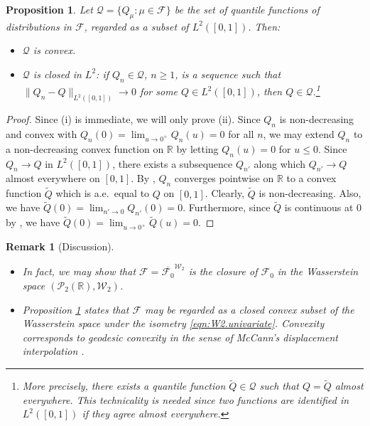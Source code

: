 \documentclass{article}
\newcommand{\bR}{\mathbb{R}}
\newcommand{\cF}{\mathcal{F}}
\newcommand{\cP}{\mathcal{P}}
\newcommand{\cQ}{\mathcal{Q}}
\newcommand{\W}{\mathcal{W}_2}
\numberwithin{equation}{section}
\newtheorem{proposition}[theorem]{Proposition}
\newtheorem{remark}[theorem]{Remark}
\begin{document}
\begin{proposition} \label{prop:Q.geometry}
Let $\cQ = \{Q_{\mu} : \mu \in \cF\}$ be the set of quantile functions of distributions in $\cF$, regarded as a subset of $L^2([0, 1])$. Then:
\begin{itemize}
\item[(i)] $\cQ$ is convex.
\item[(ii)] $\cQ$ is closed in $L^2$: if $Q_n \in \cQ$, $n \geq 1$, is a sequence such that $\|Q_n - Q\|_{L^2([0, 1])} \rightarrow 0$ for some $Q \in L^2([0, 1])$, then $Q \in \cQ$.\footnote{More precisely, there exists a quantile function $\tilde{Q} \in \cQ$ such that $Q = \tilde{Q}$ almost everywhere. This technicality is needed since two functions are identified in $L^2([0, 1])$ if they agree almost everywhere.} 
\end{itemize}
\end{proposition}
\begin{proof}
Since (i) is immediate, we will only prove (ii). Since $Q_n$ is non-decreasing and convex with $Q_n(0) = \lim_{u \rightarrow 0^+} Q_n(u) = 0$ for all $n$, we may extend $Q_n$ to a non-decreasing convex function on $\bR$ by letting $Q_n(u) = 0$ for $u \leq 0$. Since $Q_n \rightarrow Q$ in $L^2([0, 1])$, there exists a subsequence $Q_{n'}$ along which $Q_{n'} \rightarrow Q$ almost everywhere on $[0, 1]$. By \cite[Theorem 10.8]{R70}, $Q_n$ converges pointwise on $\bR$ to a convex function $\tilde{Q}$ which is a.e.~equal to $Q$ on $[0, 1]$. Clearly, $\tilde{Q}$ is non-decreasing. Also, we have $\tilde{Q}(0) = \lim_{n' \rightarrow 0} Q_{n'}(0) = 0$. Furthermore, since $\tilde{Q}$ is continuous at $0$ by \cite[Theorem 10.1]{R70}, we have $\tilde{Q}(0) = \lim_{u \rightarrow 0^+} \tilde{Q}(u) = 0$.
\end{proof}

\begin{remark}[Discussion] { \ }
\begin{itemize}
\item[(i)] In fact, we may show that $\cF = \overline{\cF_0}^{\W}$ is the closure of $\cF_0$ in the Wasserstein space $(\cP_2(\bR), \W)$.
\item[(ii)] Proposition \ref{prop:Q.geometry} states that $\cF$ may be regarded as a closed convex subset of the Wasserstein space under the isometry \eqref{eqn:W2.univariate}. Convexity corresponds to geodesic convexity in the sense of McCann's displacement interpolation \cite{R97}.
\end{itemize}
\end{remark}
\end{document}
